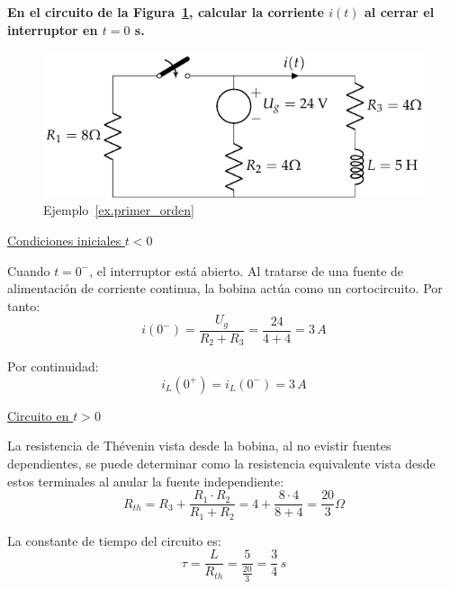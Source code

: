 	\begin{example}\label{ex.primer_orden}
	    \textbf{En el circuito de la Figura~\ref{fig.ej_transitorio_1orden}, calcular la corriente $i(t)$ al cerrar el interruptor en $t = 0$ s.}
	    \begin{figure}[H]
	        \centering
	        \includegraphics{../figs/ej_transitorio_1orden.pdf}
	        \caption{Ejemplo~\ref{ex.primer_orden}}
	        \label{fig.ej_transitorio_1orden}
	    \end{figure}
	    
	    \underline{Condiciones iniciales $t<0$}
	    
	    Cuando $t=0^-$, el interruptor está abierto. Al tratarse de una fuente de alimentación de corriente continua, la bobina actúa como un cortocircuito. Por tanto:
	    \begin{equation*}
	        i(0^-)=\dfrac{U_g}{R_2+R_3}=\dfrac{24}{4+4}=3\,A
	    \end{equation*}
	    
	    Por continuidad:
	    \begin{equation*}
	        i_L(0^+)=i_L(0^-)=3\,A
	    \end{equation*}
	    
	    \underline{Circuito en $t>0$}
	    
	    La resistencia de Thévenin vista desde la bobina, al no evistir fuentes dependientes, se puede determinar como la resistencia equivalente vista desde estos terminales al anular la fuente independiente:
	    \begin{equation*}
	        R_{th}=R_3+\dfrac{R_1\cdot R_2}{R_1+R_2}=4+\dfrac{8\cdot 4}{8+4}=\dfrac{20}{3}\Omega
	    \end{equation*}
	    
	    La constante de tiempo del circuito es:
	    \begin{equation*}
	        \tau=\dfrac{L}{R_{th}}=\dfrac{5}{\frac{20}{3}}=\dfrac{3}{4} \,s
	    \end{equation*}
	    

\end{example}
